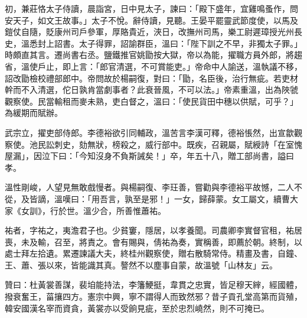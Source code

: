 \begin{pinyinscope}
 初，兼莊恪太子侍讀，晨詣宮，日中見太子，諫曰：「殿下盛年，宜雞鳴蚤作，問安天子，如文王故事。」太子不悅。辭侍讀，見聽。王晏平罷靈武節度使，以馬及鎧仗自隨，貶康州司戶參軍，厚賂貴近，浹日，改撫州司馬，樂工尉遲璋授光州長史，溫悉封上詔書。太子得罪，詔諭群臣，溫曰：「陛下訓之不早，非獨太子罪。」時頗直其言。遷尚書右丞。鹽鐵推官姚勖按大獄，帝以為能，擢職方員外郎，將趨省，溫使戶止，即上言：「郎官清選，不可賞能吏。」帝命中人諭送，溫執議不移，詔改勖檢校禮部郎中。帝問故於楊嗣復，對曰：「勖，名臣後，治行無疵。若吏材幹而不入清選，佗日孰肯當劇事者？此衰晉風，不可以法。」帝素重溫，出為陜虢觀察使。民當輸租而麥未熟，吏白督之，溫曰：「使民貨田中穗以供賦，可乎？」為緩期而賦辦。



 武宗立，擢吏部侍郎。李德裕欲引同輔政，溫苦言李漢可釋，德裕悵然，出宣歙觀察使。池民訟刺史，劾無狀，榜殺之，威行部中。既疾，召親屬，賦綬詩「在室愧屋漏」，因泣下曰：「今知沒身不負斯誡矣！」卒，年五十八，贈工部尚書，謚曰孝。



 溫性剛峻，人望見無敢戲慢者。與楊嗣復、李玨善，嘗勸與李德裕平故憾，二人不從，及皆謫，溫嘆曰：「用吾言，孰至是邪！」一女，歸薛蒙。女工屬文，續曹大家《女訓》，行於世。溫少合，所善惟蕭祐。



 祐者，字祐之，夷澹君子也。少貧窶，隱居，以孝養聞。司農卿李實督官租，祐居喪，未及輸，召至，將責之。會有賜與，倩祐為奏，實稱善，即薦於朝。終制，以處士拜左拾遺。累遷諫議大夫，終桂州觀察使，贈右散騎常侍。精畫及書，自鐘、王、蕭、張以來，皆能識其真。謷然不以塵事自蒙，故溫號「山林友」云。



 贊曰：杜黃裳善謀，裴垍能持法，李籓鯁挺，韋貫之忠實，皆足穆天縡，經國體，撥衰奮王，菑攘四方。憲宗中興，寧不謂得人而致然邪？昔子貢孔堂高第而貨殖，韓安國漢名宰而資貪，黃裳亦以受餉見疵，至於忠烈嶢然，則不可掩已。



\end{pinyinscope}